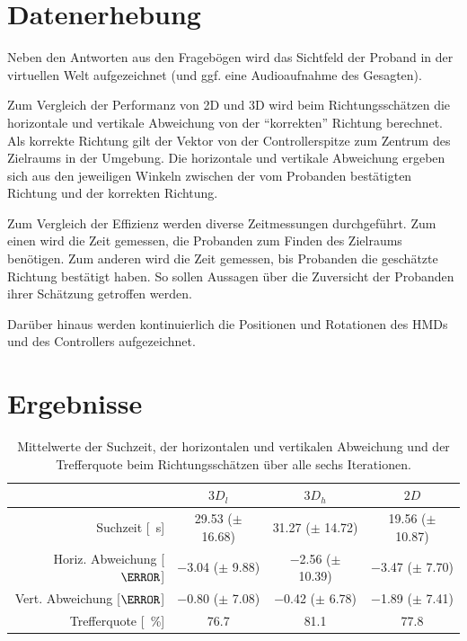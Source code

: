 \section{Datenerhebung}
Neben den Antworten aus den Fragebögen wird das Sichtfeld der Proband in der virtuellen Welt aufgezeichnet (und ggf. eine Audioaufnahme des Gesagten).

Zum Vergleich der Performanz von 2D und 3D wird beim Richtungsschätzen die horizontale und vertikale Abweichung von der \enquote{korrekten} Richtung berechnet.
Als korrekte Richtung gilt der Vektor von der Controllerspitze zum Zentrum des Zielraums in der Umgebung.
Die horizontale und vertikale Abweichung ergeben sich aus den jeweiligen Winkeln zwischen der vom Probanden bestätigten Richtung und der korrekten Richtung.

Zum Vergleich der Effizienz werden diverse Zeitmessungen durchgeführt.
Zum einen wird die Zeit gemessen, die Probanden zum Finden des Zielraums benötigen.
Zum anderen wird die Zeit gemessen, bis Probanden die geschätzte Richtung bestätigt haben.
So sollen Aussagen über die Zuversicht der Probanden ihrer Schätzung getroffen werden.

Darüber hinaus werden kontinuierlich die Positionen und Rotationen des HMDs und des Controllers aufgezeichnet.

\section{Ergebnisse}

\begin{table}
    \centering
    \caption{Mittelwerte der Suchzeit, der horizontalen und vertikalen Abweichung und der Trefferquote beim Richtungsschätzen über alle sechs Iterationen.}
    \label{tab:means_per_condition}
    \begin{tabular}{@{}rccc@{}}
        \toprule
        {} & $3D_l$ & $3D_h$ & $2D$ \\
        \midrule
        Suchzeit [\SI{}{\second}]      & \num{29.53} ($\pm$ \num{16.68}) &  \num{31.27} ($\pm$ \num{14.72}) & \num{19.56} ($\pm$ \num{10.87}) \\
        
        Horiz. Abweichung [$\degree$]  & \num{-3.04} ($\pm$ \num{9.88})  & \num{-2.56} ($\pm$ \num{10.39})  & \num{-3.47} ($\pm$ \num{7.70}) \\
        
        Vert. Abweichung [$\degree$]   & \num{-0.80} ($\pm$ \num{7.08})  &  \num{-0.42} ($\pm$ \num{6.78})  & \num{-1.89} ($\pm$ \num{7.41}) \\
        
        Trefferquote [\SI{}{\percent}] & \num{76.7}                      &  \num{81.1}                      & \num{77.8}\\
        \bottomrule
    \end{tabular}
\end{table}

